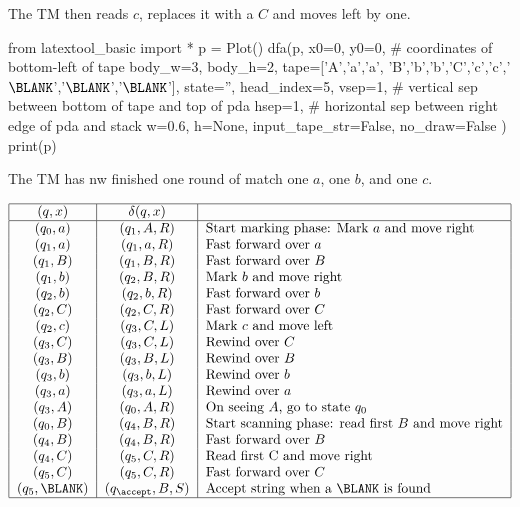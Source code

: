 \begin{eg}
The TM then reads $c$, replaces it with a $C$ and moves left by one.
\begin{python}
from latextool_basic import *
p = Plot()
dfa(p,
        x0=0, y0=0, # coordinates of bottom-left of tape
        body_w=3,
        body_h=2,
        tape=['A','a','a', 'B','b','b','C','c','c','$\BLANK$','$\BLANK$','$\BLANK$'], state='',
        head_index=5,
        vsep=1,  # vertical sep between bottom of tape and top of pda
        hsep=1,  # horizontal sep between right edge of pda and stack
        w=0.6, h=None,
        input_tape_str=False,
        no_draw=False
        )
print(p)
\end{python}

The TM has nw finished one round of match one $a$, one $b$, and one $c$.

\[
\begin{tabular}{|c|c|l|}
  \hline
  $(q,x)$ & $\delta(q,x)$ & \mbox{} \\
  \hline
  $(q_0,a)$ & $(q_1,A,R)$ & Start marking phase: Mark $a$ and move right \\
  $(q_1,a)$ & $(q_1,a,R)$ & Fast forward over $a$ \\
  $(q_1,B)$ & $(q_1,B,R)$ & Fast forward over $B$ \\
  $(q_1,b)$ & $(q_2,B,R)$ & Mark $b$ and move right \\
  $(q_2,b)$ & $(q_2,b,R)$ & Fast forward over $b$ \\
  $(q_2,C)$ & $(q_2,C,R)$ & Fast forward over $C$ \\
  $(q_2,c)$ & $(q_3,C,L)$ & Mark $c$ and move left \\
  $(q_3,C)$ & $(q_3,C,L)$ & Rewind over $C$ \\
  $(q_3,B)$ & $(q_3,B,L)$ & Rewind over $B$ \\
  $(q_3,b)$ & $(q_3,b,L)$ & Rewind over $b$ \\
  $(q_3,a)$ & $(q_3,a,L)$ & Rewind over $a$ \\
  $(q_3,A)$ & $(q_0,A,R)$ & On seeing $A$, go to state $q_0$\\
  $(q_0,B)$ & $(q_4,B,R)$ & Start scanning phase: read first $B$ and move right\\
  $(q_4,B)$ & $(q_4,B,R)$ & Fast forward over $B$ \\
  $(q_4,C)$ & $(q_5,C,R)$ & Read first C and move right\\
  $(q_5,C)$ & $(q_5,C,R)$ & Fast forward over $C$\\
  $(q_5,\BLANK)$ & $(q_{\accept},B,S)$ & Accept string when a $\BLANK$ is found\\
  \hline
\end{tabular}
\]


\end{eg}
